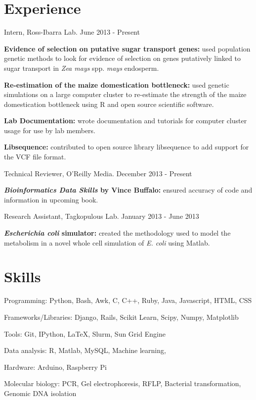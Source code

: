 \documentclass[letterpaper]{article}
\renewenvironment{itemize}{
  \begin{list}{}{
    \setlength{\leftmargin}{1.5em}
  }
}{
  \end{list}
}
\begin{document}
\section*{Experience}
\begin{itemize}
\item Intern, Ross-Ibarra Lab. \hfill June 2013 - Present
	\begin{itemize}
	\item \textbf{Evidence of selection on putative sugar transport genes:} used population genetic methods to look for evidence of selection on genes putatively linked to sugar transport in \textit{Zea mays} spp. \textit{mays} endosperm.
	\item \textbf{Re-estimation of the maize domestication bottleneck:} used genetic simulations on a large computer cluster to re-estimate the strength of the maize domestication bottleneck using R and open source scientific software.
	\item \textbf{Lab Documentation:} wrote documentation and tutorials for computer cluster usage for use by lab members. 
	\item \textbf{Libsequence:} contributed to open source library libsequence to add support for the VCF file format. 
	\end{itemize}
\item Technical Reviewer, O'Reilly Media. \hfill December 2013 - Present
	\begin{itemize}
	\item \textbf{\textit{Bioinformatics Data Skills} by Vince Buffalo:} ensured accuracy of code and information in upcoming book.
	\end{itemize}
\item Research Assistant, Tagkopulous Lab. \hfill January 2013 - June 2013
	\begin{itemize}
	\item \textbf{\textit{Escherichia coli} simulator:} created the methodology used to model the metabolism in a novel whole cell simulation of \textit{E. coli} using Matlab.
	\end{itemize}
\end{itemize}

\section*{Skills}
\begin{itemize}
\item Programming: Python, Bash, Awk, C, C++, Ruby, Java, Javascript, HTML, CSS
\item Frameworks/Libraries: Django, Rails, Scikit Learn, Scipy, Numpy, Matplotlib
\item Tools: Git, IPython, LaTeX, Slurm, Sun Grid Engine
\item Data analysis: R, Matlab, MySQL, Machine learning, 
\item Hardware: Arduino, Raspberry Pi
\item Molecular biology: PCR, Gel electrophoresis, RFLP, Bacterial transformation, Genomic DNA isolation
\end{itemize}
\end{document}
